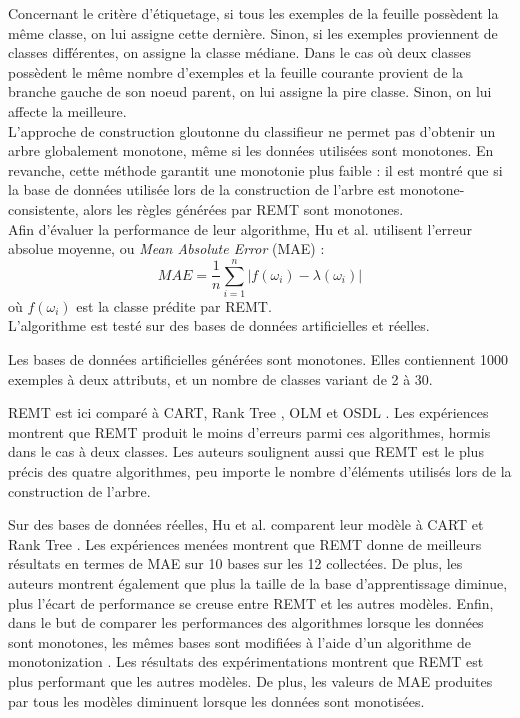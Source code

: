 \documentclass[a4paper]{article}
\begin{document}
Concernant le critère d'étiquetage, si tous les exemples de la feuille possèdent
la même classe, on lui assigne cette dernière. Sinon, si les exemples
proviennent de classes différentes, on assigne la classe médiane. Dans le cas où
deux classes possèdent le même nombre d'exemples et la feuille courante provient
de la branche gauche de son noeud parent, on lui assigne la pire classe. Sinon,
on lui affecte la meilleure.  \\

L'approche de construction gloutonne du classifieur ne permet pas d'obtenir un
arbre globalement monotone, même si les données utilisées sont monotones. En
revanche, cette méthode garantit une monotonie plus faible : il est montré que
si la base de données utilisée lors de la construction de l'arbre est
monotone-consistente, alors les règles générées par REMT sont monotones. \\

Afin d'évaluer la performance de leur algorithme, Hu et al. utilisent l'erreur absolue moyenne, ou
\textit{Mean Absolute Error} (MAE) :
$$ MAE = \frac{1}{n} \sum_{i=1}^{n}|f(\omega_i) - \lambda(\omega_i)| $$
où $f(\omega_i)$ est la classe prédite par REMT. \\

L'algorithme est testé sur des bases de données artificielles et réelles. 

\noindent Les bases de données artificielles générées sont monotones. Elles contiennent
1000 exemples à deux attributs, et un nombre de classes variant de 2 à 30. 

\noindent REMT est ici comparé à CART, Rank Tree \cite{xia-ranking}, OLM
\cite{ben-learning} et OSDL \cite{cao-supervised}. Les expériences montrent que
REMT produit le moins d'erreurs parmi ces algorithmes, hormis dans le cas à deux
classes.  Les auteurs soulignent aussi que REMT est le plus précis des quatre
algorithmes, peu importe le nombre d'éléments utilisés lors de la construction
de l'arbre.


Sur des bases de données réelles, Hu et al. comparent leur modèle à CART et Rank
Tree \cite{xia-ranking}. Les expériences menées montrent que REMT donne de
meilleurs résultats en termes de MAE sur 10 bases sur les 12 collectées. De
plus, les auteurs montrent également que plus la taille de la base
d'apprentissage diminue, plus l'écart de performance se creuse entre REMT et les
autres modèles. 
\noindent Enfin, dans le but de comparer les performances des algorithmes
lorsque les données sont monotones, les mêmes bases sont modifiées à l'aide d'un
algorithme de monotonization . Les résultats des expérimentations montrent que
REMT est plus performant que les autres modèles. De plus, les valeurs de
MAE produites par tous les modèles diminuent lorsque les données sont
monotisées.
\end{document}

